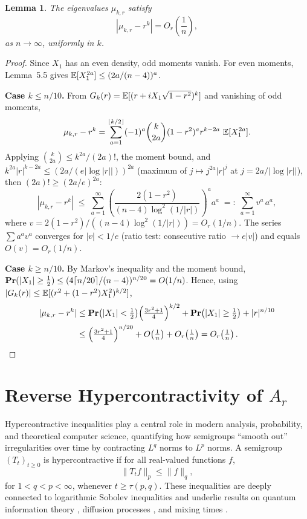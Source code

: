 \documentclass[11pt]{article}
\newtheorem{lemma}[theorem]{Lemma}
\newcommand{\floor}[1]{\left\lfloor #1 \right\rfloor}
\renewcommand{\Pr}{\mathop{\bf Pr\/}}
\newcommand{\E}{\mathop{\mathbb E\/}}
\begin{document}
\begin{lemma}\label{lem: mu estimate}
The eigenvalues $\mu_{k,r}$ satisfy
\[
|\mu_{k,r} - r^k| = O_r\!\left(\frac{1}{n}\right),
\]
as $n \to \infty$, uniformly in $k$.
\end{lemma}
\begin{proof}
Since $X_1$ has an even density, odd moments vanish. For even moments, \cite{regev2011quantum} Lemma~5.5 gives $\E[X_1^{2a}] \leq (2a/(n-4))^a$.

\textbf{Case $k \leq n/10$.}
From $G_k(r) = \E[(r+iX_1\sqrt{1-r^2})^k]$ and vanishing of odd moments,
\[
\mu_{k,r} - r^k
= \sum_{a=1}^{\floor{k/2}}(-1)^a\binom{k}{2a}(1-r^2)^a r^{k-2a}\,\E[X_1^{2a}].
\]
Applying $\binom{k}{2a}\leq k^{2a}/(2a)!$, the moment bound, and $k^{2a}|r|^{k-2a} \leq (2a/(e|\!\log|r||))^{2a}$ (maximum of $j\mapsto j^{2a}|r|^j$ at $j=2a/|\!\log|r||$), then $(2a)!\geq(2a/e)^{2a}$:
\[
|\mu_{k,r}-r^k|
\;\leq\; \sum_{a=1}^{\infty}
\left(\frac{2(1-r^2)}{(n-4)\log^2(1/|r|)}\right)^{\!a} a^a
\;=:\; \sum_{a=1}^\infty v^a\, a^a,
\]
where $v = 2(1-r^2)/((n-4)\log^2(1/|r|)) = O_r(1/n)$.
The series $\sum a^a v^a$ converges for $|v|<1/e$ (ratio test: consecutive ratio $\to e|v|$) and equals $O(v) = O_r(1/n)$.

\textbf{Case $k \geq n/10$.}
By Markov's inequality and the moment bound,
$\Pr(|X_1|\geq\tfrac12) \leq (4\lceil n/20\rceil/(n-4))^{n/20} = O(1/n)$.
Hence, using $|G_k(r)|\leq\E[(r^2+(1-r^2)X_1^2)^{k/2}]$,
\begin{align*}
|\mu_{k,r}-r^k|
&\leq \Pr\!\left(|X_1|<\tfrac12\right)\!\left(\tfrac{3r^2+1}{4}\right)^{k/2}
  +\Pr\!\left(|X_1|\geq\tfrac12\right)+|r|^{n/10}\\
&\leq \left(\tfrac{3r^2+1}{4}\right)^{n/20}+O\!\left(\tfrac1n\right)+O_r\!\left(\tfrac1n\right)
= O_r\!\left(\tfrac1n\right).\qedhere
\end{align*}
\end{proof}

\section{Reverse Hypercontractivity of \texorpdfstring{$A_r$}{TEXT}}\label{sec: reverse hypercontrative}
Hypercontractive inequalities play a central role in modern analysis, probability, and theoretical computer science, quantifying how semigroups ``smooth out'' irregularities over time by contracting \(L^q\) norms to \(L^p\) norms. A semigroup \( (T_t)_{t \geq 0} \) is hypercontractive if for all real-valued functions \(f\),
\[
\|T_t f\|_p \leq \|f\|_q,
\]
for \(1 < q < p < \infty\), whenever \(t \ge \tau(p,q)\). These inequalities are deeply connected to logarithmic Sobolev inequalities \cite{gross1975logarithmic} and underlie results on quantum information theory \cite{montanaro2012some}, diffusion processes \cite{bakry2006diffusions}, and mixing times \cite{bobkov2003modified}.
\end{document}

